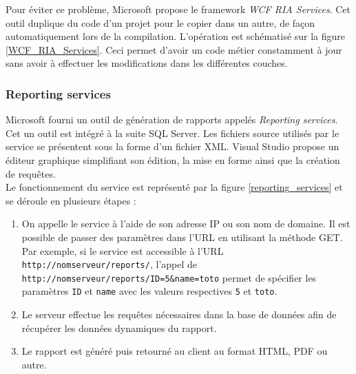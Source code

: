 Pour éviter ce problème, Microsoft propose le framework \textit{WCF RIA Services}. Cet outil duplique du code d'un projet pour le copier dans un autre, de façon automatiquement lors de la compilation. L'opération est schématisé sur la figure \ref{WCF_RIA_Services}. Ceci permet d'avoir un code métier constamment à jour sans avoir à effectuer les modifications dans les différentes couches.


\subsubsection{Reporting services}

Microsoft fourni un outil de génération de rapports appelés \textit{Reporting services}. Cet un outil est intégré à la suite SQL Server. Les fichiers source utilisés par le service se présentent sous la forme d'un fichier XML. Visual Studio propose un éditeur graphique simplifiant son édition, la mise en forme ainsi que la création de requêtes.
\\

Le fonctionnement du service est représenté par la figure \ref{reporting_services} et se déroule en plusieurs étapes :
\begin{enumerate}
	\item On appelle le service à l'aide de son adresse IP ou son nom de domaine. Il est possible de passer des paramètres dans l'URL en utilisant la méthode GET. Par exemple, si le service est accessible à l'URL \lstinline{http://nomserveur/reports/}, l'appel de \lstinline{http://nomserveur/reports/ID=5&name=toto} permet de spécifier les paramètres \lstinline{ID} et \lstinline{name} avec les valeurs respectives \lstinline{5} et \lstinline{toto}.
	\item Le serveur effectue les requêtes nécessaires dans la base de données afin de récupérer les données dynamiques du rapport.
	\item Le rapport est généré puis retourné au client au format HTML, PDF ou autre.
\end{enumerate}
~~\\

